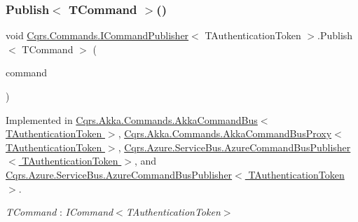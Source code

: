 \subsubsection{\texorpdfstring{Publish$<$ T\+Command $>$()}{Publish< TCommand >()}\hspace{0.1cm}{\footnotesize\ttfamily [1/2]}}
{\footnotesize\ttfamily void \hyperlink{interfaceCqrs_1_1Commands_1_1ICommandPublisher}{Cqrs.\+Commands.\+I\+Command\+Publisher}$<$ T\+Authentication\+Token $>$.Publish$<$ T\+Command $>$ (\begin{DoxyParamCaption}\item[{T\+Command}]{command }\end{DoxyParamCaption})}



Implemented in \hyperlink{classCqrs_1_1Akka_1_1Commands_1_1AkkaCommandBus_a48e1d46035b1e1a3251636b8a03f7dae_a48e1d46035b1e1a3251636b8a03f7dae}{Cqrs.\+Akka.\+Commands.\+Akka\+Command\+Bus$<$ T\+Authentication\+Token $>$}, \hyperlink{classCqrs_1_1Akka_1_1Commands_1_1AkkaCommandBusProxy_a410c0fe52016d04de950b1ae767d2ccb_a410c0fe52016d04de950b1ae767d2ccb}{Cqrs.\+Akka.\+Commands.\+Akka\+Command\+Bus\+Proxy$<$ T\+Authentication\+Token $>$}, \hyperlink{classCqrs_1_1Azure_1_1ServiceBus_1_1AzureCommandBusPublisher_aefdaed600f88cc645a1b7ab41db42a69_aefdaed600f88cc645a1b7ab41db42a69}{Cqrs.\+Azure.\+Service\+Bus.\+Azure\+Command\+Bus\+Publisher$<$ T\+Authentication\+Token $>$}, and \hyperlink{classCqrs_1_1Azure_1_1ServiceBus_1_1AzureCommandBusPublisher_aefdaed600f88cc645a1b7ab41db42a69_aefdaed600f88cc645a1b7ab41db42a69}{Cqrs.\+Azure.\+Service\+Bus.\+Azure\+Command\+Bus\+Publisher$<$ T\+Authentication\+Token $>$}.

\begin{Desc}
\item[Type Constraints]\begin{description}
\item[{\em T\+Command} : {\em I\+Command$<$T\+Authentication\+Token$>$}]\end{description}
\end{Desc}
\mbox{\label{interfaceCqrs_1_1Commands_1_1ICommandPublisher_af0f033c0b949e5650032e4f00b11b595_af0f033c0b949e5650032e4f00b11b595}} 
